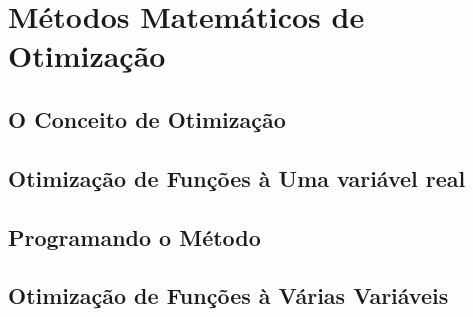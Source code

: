 

\chapter{\Large{Métodos Matemáticos de Otimização}}\label{chp:1}


\section{{O Conceito de Otimização}}

\hspace{0.8cm}

\section{{Otimização de Funções à Uma variável real}}

\hspace{0.8cm}

\section{{Programando o Método}}

\hspace{0.8cm}

\textcolor[rgb]{1,0,0}{\section{{Otimização de Funções à Várias Variáveis}}}

\hspace{0.8cm}
